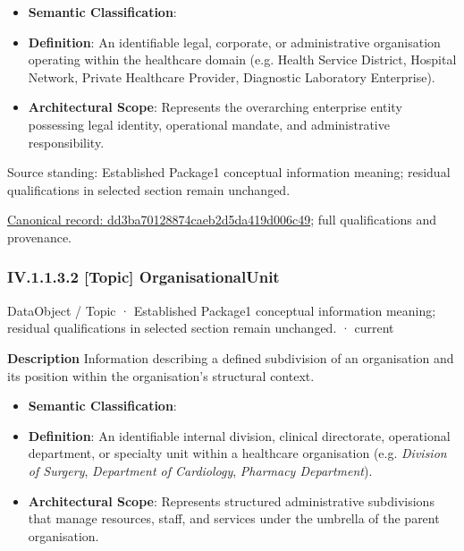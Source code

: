 \begin{itemize}


\item \textbf{Semantic Classification}: \texttt{}

\item \textbf{Definition}: An identifiable legal, corporate, or administrative organisation operating within the healthcare domain (e.g. Health Service District, Hospital Network, Private Healthcare Provider, Diagnostic Laboratory Enterprise).

\item \textbf{Architectural Scope}: Represents the overarching enterprise entity possessing legal identity, operational mandate, and administrative responsibility.

\end{itemize}


Source standing: Established Package1 conceptual information meaning; residual qualifications in selected section remain unchanged.


{\footnotesize \href{../../../../../../../continuum/application/data-object/topic/dd3ba70128874caeb2d5da419d006c49.md}{Canonical record: dd3ba70128874caeb2d5da419d006c49}; full qualifications and provenance.}\par
\subsubsection*{IV.1.1.3.2 [Topic] OrganisationalUnit}
\label{navigation:IV.1.1.3.2}

\label{element:2c884cdd6a4b41a184818e3a7e540897}
{\small DataObject / Topic · Established Package1 conceptual information meaning; residual qualifications in selected section remain unchanged. · current}\par

\textbf{Description}
Information describing a defined subdivision of an organisation and its position within the organisation's structural context.



\begin{itemize}


\item \textbf{Semantic Classification}: \texttt{}

\item \textbf{Definition}: An identifiable internal division, clinical directorate, operational department, or specialty unit within a healthcare organisation (e.g. \emph{Division of Surgery}, \emph{Department of Cardiology}, \emph{Pharmacy Department}).

\item \textbf{Architectural Scope}: Represents structured administrative subdivisions that manage resources, staff, and services under the umbrella of the parent organisation.

\end{itemize}



